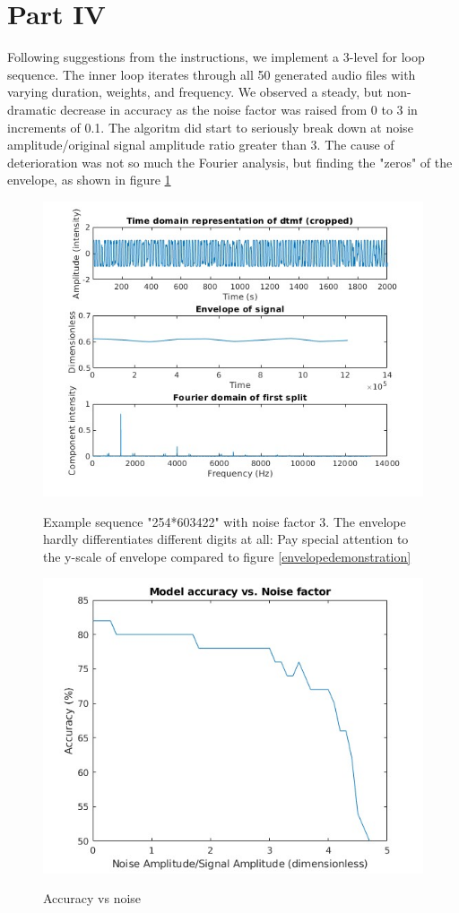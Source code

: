 \documentclass{article}
\begin{document}
\section{Part IV}
Following suggestions from the instructions, we implement a 3-level for loop sequence. The inner loop iterates through all 50 generated audio files with varying duration, weights, and frequency.
We observed a steady, but non-dramatic decrease in accuracy as the noise factor was raised from 0 to 3 in increments of 0.1. The algoritm did start to seriously break down at noise amplitude/original signal amplitude ratio greater than 3.
The cause of deterioration was not so much the Fourier analysis, but finding the "zeros" of the envelope, as shown in figure \ref{noisy}
\begin{figure}[h]
	\includegraphics[width =\textwidth]{noisy.jpg}
	\label{noisy}
	\caption{Example sequence "254*603422" with noise factor 3. The envelope hardly differentiates different digits at all: Pay special attention to the y-scale of envelope compared to figure \ref{envelopedemonstration}}
\end{figure}

\begin{figure}[h]
	\includegraphics[width =\textwidth]{accuracy.jpg}
	\label{accuracy}
	\caption{Accuracy vs noise}
\end{figure}
\end{document}
